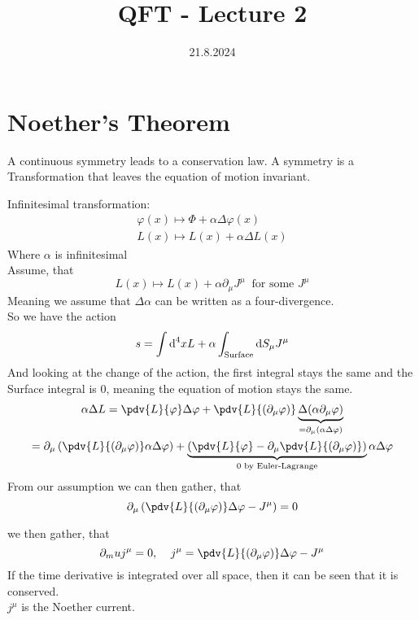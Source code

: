 \documentclass[]{scrartcl}
\title{QFT - Lecture 2}
\author{}
\date{21.8.2024}
\begin{document}
\maketitle
\newpage
\tableofcontents
\newpage

 \section{Noether's Theorem}

A continuous symmetry leads to a conservation law. A symmetry is a Transformation that leaves the equation of motion invariant.

Infinitesimal transformation:
\begin{gather}
	\varphi(x) \mapsto \Phi + \alpha\Delta\varphi(x)\\
	L(x) \mapsto L(x) + \alpha\Delta L(x)
\end{gather}
Where $\alpha$ is infinitesimal\\
Assume, that
\begin{equation}
	L(x)\mapsto L(x) + \alpha\partial_\mu J^\mu\;\;\text{for some }J^\mu
\end{equation}
Meaning we assume that $\Delta\alpha$ can be written as a four-divergence.\\
So we have the action
\begin{equation}
	s = \int\text d ^4x L + \alpha \int_\text{Surface}\text{d} S_\mu J^\mu
\end{equation}
And looking at the change of the action, the first integral stays the same and the Surface integral is 0, meaning the equation of motion stays the same.
\begin{gather}
	\alpha\Delta L = \pdv{L}{\varphi}\Delta\varphi + \pdv{L}{(\partial_\mu\varphi)}\underbrace{\Delta(\alpha\partial_\mu\varphi)}_{= \partial_\mu(\alpha\Delta\varphi)}\\
	= \partial_\mu\left(\pdv{L}{(\partial_\mu\varphi)}\alpha\Delta\varphi\right) + \underbrace{\left(\pdv{L}{\varphi}-\partial_\mu\pdv{L}{(\partial_\mu\varphi)}\right)}_{0\text{ by Euler-Lagrange}}\alpha\Delta\varphi
\end{gather}
From our assumption we can then gather, that
\begin{equation}
	\partial_\mu\left(\pdv{L}{(\partial_\mu\varphi)}\Delta\varphi - J^\mu\right) = 0
\end{equation}

we then gather, that
\begin{equation}
	\partial_mu j^\mu = 0,\;\;\;\; j^\mu = \pdv{L}{(\partial_\mu\varphi)}\Delta\varphi - J^\mu
\end{equation}
If the time derivative is integrated over all space, then it can be seen that it is conserved.\\
$j^\mu$ is the Noether current.
\end{document}
